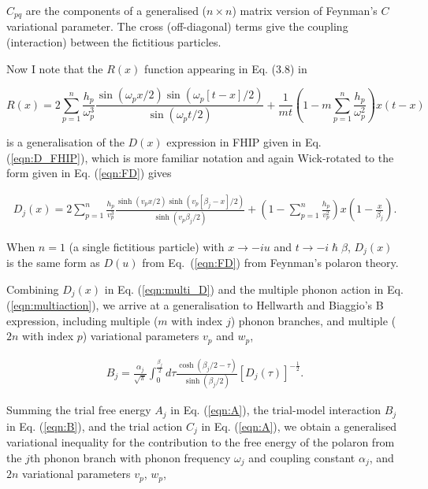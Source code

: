 $C_{pq}$ are the components of a generalised ($n \times n$) matrix version of Feynman's $C$ variational parameter. The cross (off-diagonal) terms give the coupling (interaction) between the fictitious particles. 

Now I note that the $R(x)$ function appearing in Eq. (3.8) in \cite{poulter_complete_1992} 

\begin{equation}
    R(x) = 2 \sum_{p = 1}^n \frac{h_p}{\omega_p^3} \frac{\sin(\omega_p x / 2) \sin(\omega_p [t - x] / 2)}{\sin(\omega_p t / 2)} + \frac{1}{mt} \left( 1 - m \sum_{p = 1}^n \frac{h_p}{\omega_p^2} \right) x (t - x)
\end{equation}

is a generalisation of the $D(x)$ expression in FHIP given in Eq. (\ref{eqn:D_FHIP}), which is more familiar notation and again Wick-rotated to the form given in Eq. (\ref{eqn:FD}) gives

\begin{equation}\label{eqn:multi_D}
\begin{gathered}
    D_j(x) = 2 \sum_{p=1}^n \frac{h_{p}}{v_{p}^3} \frac{\sinh{(v_{p} x/2)\sinh{(v_{p}[\beta_j-x]/2)}}}{\sinh(v_{p}\beta_j/2)}
    + \left( 1 - \sum_{p = 1}^n \frac{h_{p}}{v_{p}^2} \right) x \left(1 - \frac{x}{\beta_j}\right).
\end{gathered}
\end{equation}

When $n=1$ (a single fictitious particle) with $x \rightarrow -iu$ and $t \rightarrow -i\hslash\beta$, $D_j(x)$ is the same form as $D(u)$ from Eq.~(\ref{eqn:FD}) from Feynman's polaron theory. 

Combining $D_j(x)$ in Eq. (\ref{eqn:multi_D}) and the multiple phonon action in Eq. (\ref{eqn:multiaction}), we arrive at a generalisation to Hellwarth and Biaggio's B expression, including multiple ($m$ with index $j$) phonon branches, and multiple ($2n$ with index $p$) variational parameters $v_{p}$ and $w_{p}$,

\begin{equation}
\begin{gathered}
    B_j = \frac{\alpha_j}{\sqrt{\pi}} \int_0^{\frac{\beta_j}{2}} d\tau \frac{\cosh (\beta_j / 2 - \tau)}{\sinh(\beta_j / 2)} \left[ D_j(\tau) \right]^{-\frac{1}{2}} .
\label{eqn:B}
\end{gathered}
\end{equation}

Summing the trial free energy $A_j$ in Eq. (\ref{eqn:A}), the trial-model interaction $B_j$ in Eq. (\ref{eqn:B}), and the trial action $C_j$ in Eq. (\ref{eqn:A}), we obtain a generalised variational inequality for the contribution to the free energy of the polaron from the $j$th phonon branch with phonon frequency $\omega_j$ and coupling constant $\alpha_j$, and $2n$ variational parameters $v_{p}$, $w_{p}$, 

